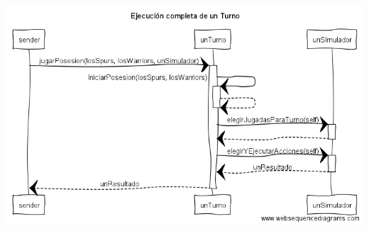 \begin{center}
\includegraphics[scale=0.4]{diseno/Ejecucion_completa_de_un_turno.png}
\end{center}


